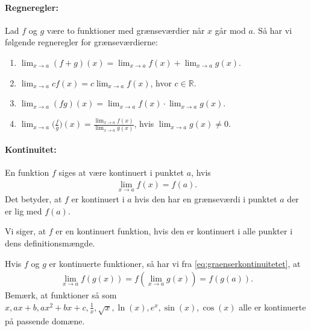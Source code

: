 \paragraph*{Regneregler:}
Lad $f$ og $g$ være to funktioner med grænseværdier når $x$ går mod $a$. Så har vi følgende regneregler for grænseværdierne:
\begin{enumerate}
\item $\displaystyle\lim_{x \to a} (f+g)(x) = \displaystyle\lim_{x \to a} f(x) + \lim_{x \to a} g(x)$.
\item $\displaystyle\lim_{x \to a} cf(x) = c \displaystyle\lim_{x \to a} f(x)$, hvor $c \in \mathbb{R}$.
\item $\displaystyle\lim_{x \to a} (fg)(x) = \displaystyle\lim_{x \to a} f(x) \cdot \lim_{x \to a} g(x)$.
\item $\displaystyle \lim_{x \to a} \Big(\frac{f}{g}\Big)(x) = \frac{\displaystyle\lim_{x \to a} f(x)}{\displaystyle\lim_{x \to a} g(x)}$, hvis $\displaystyle\lim_{x \to a} g(x) \neq 0$.
\end{enumerate}

\paragraph*{Kontinuitet:}
En funktion $f$ siges at være kontinuert i punktet $a$, hvis
\begin{align}\label{eq:graenserkontinuitetet}
\lim_{x \to a} f(x) = f(a).
\end{align}
Det betyder, at $f$ er kontinuert i $a$ hvis den har en grænseværdi i punktet $a$ der er lig med $f(a)$.

Vi siger, at $f$ er en kontinuert funktion, hvis den er kontinuert i alle punkter i dens definitionsmængde.  

Hvis $f$ og $g$ er kontinuerte funktioner, så har vi fra \eqref{eq:graenserkontinuitetet}, at
\begin{align*}
\lim_{x \to a} f(g(x)) = f(\lim_{x \to a} g(x)) = f(g(a)).
\end{align*}
Bemærk, at funktioner så som $x,ax+b,ax^2+bx+c,\frac{1}{x},\sqrt{x},\ln(x), e^x, \sin(x),\cos(x)$ alle er kontinuerte på passende domæne.

